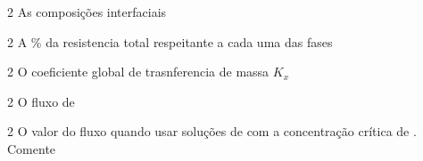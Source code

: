 \documentclass[\mainfilename]{subfiles}
\begin{document}
\begin{questionBox}2{ %
    As composições interfaciais
} %
\end{questionBox}

\begin{questionBox}2{ %
    A \% da resistencia total respeitante a cada uma das fases
} %
\end{questionBox}

\begin{questionBox}2{ %
    O coeficiente global de trasnferencia de massa \(K_x\)
} %
\end{questionBox}

\begin{questionBox}2{ %
    O fluxo de 
} %
\end{questionBox}

\begin{questionBox}2{ %
    O valor do fluxo quando usar soluções de  com a concentração crítica de . Comente
} %
\end{questionBox}
\end{document}
